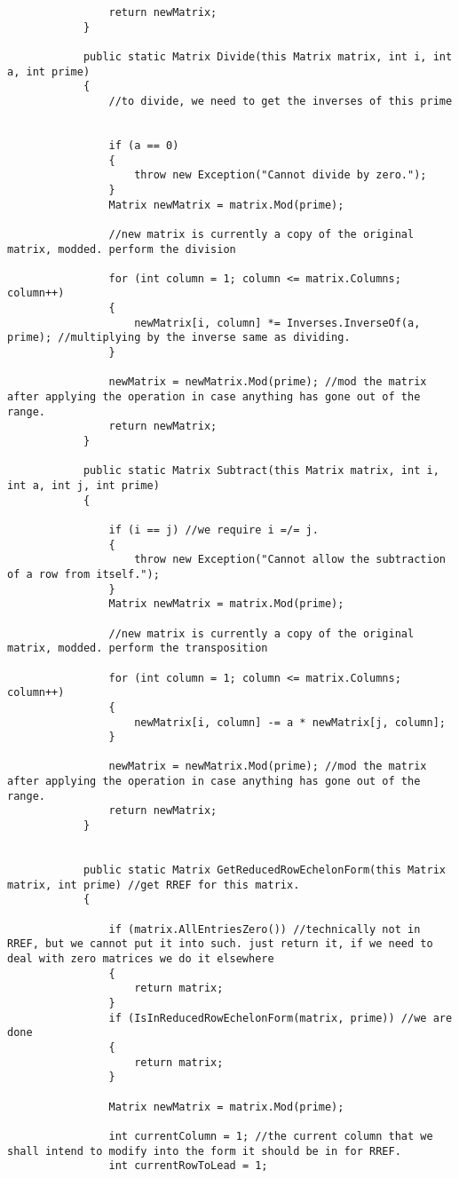 \documentclass{article}
\begin{document}
\begin{lstlisting}
				return newMatrix;
			}
			
			public static Matrix Divide(this Matrix matrix, int i, int a, int prime)
			{
				//to divide, we need to get the inverses of this prime
				
				
				if (a == 0)
				{
					throw new Exception("Cannot divide by zero.");
				}
				Matrix newMatrix = matrix.Mod(prime);
				
				//new matrix is currently a copy of the original matrix, modded. perform the division
				
				for (int column = 1; column <= matrix.Columns; column++)
				{
					newMatrix[i, column] *= Inverses.InverseOf(a, prime); //multiplying by the inverse same as dividing.
				}
				
				newMatrix = newMatrix.Mod(prime); //mod the matrix after applying the operation in case anything has gone out of the range.
				return newMatrix;
			}
			
			public static Matrix Subtract(this Matrix matrix, int i, int a, int j, int prime)
			{
				
				if (i == j) //we require i =/= j.
				{
					throw new Exception("Cannot allow the subtraction of a row from itself.");
				}
				Matrix newMatrix = matrix.Mod(prime);
				
				//new matrix is currently a copy of the original matrix, modded. perform the transposition
				
				for (int column = 1; column <= matrix.Columns; column++)
				{
					newMatrix[i, column] -= a * newMatrix[j, column];
				}
				
				newMatrix = newMatrix.Mod(prime); //mod the matrix after applying the operation in case anything has gone out of the range.
				return newMatrix;
			}
			
			
			public static Matrix GetReducedRowEchelonForm(this Matrix matrix, int prime) //get RREF for this matrix.
			{
				
				if (matrix.AllEntriesZero()) //technically not in RREF, but we cannot put it into such. just return it, if we need to deal with zero matrices we do it elsewhere
				{
					return matrix;
				}
				if (IsInReducedRowEchelonForm(matrix, prime)) //we are done
				{
					return matrix;
				}
				
				Matrix newMatrix = matrix.Mod(prime);
				
				int currentColumn = 1; //the current column that we shall intend to modify into the form it should be in for RREF.
				int currentRowToLead = 1;
				

\end{lstlisting}
\end{document}
